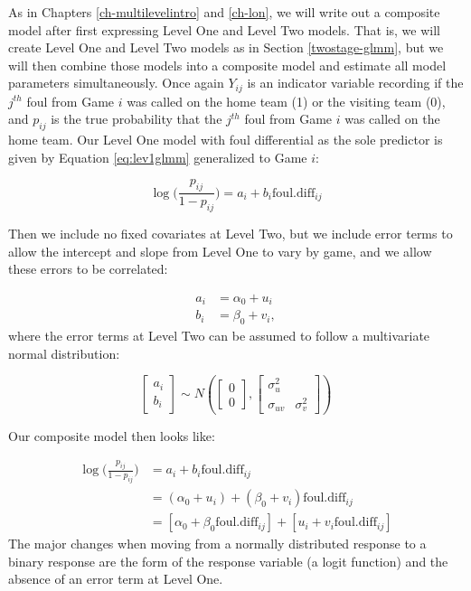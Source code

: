 \documentclass[
]{krantz}
\begin{document}
As in Chapters \ref{ch-multilevelintro} and \ref{ch-lon}, we will write out a composite model after first expressing Level One and Level Two models. That is, we will create Level One and Level Two models as in Section \ref{twostage-glmm}, but we will then combine those models into a composite model and estimate all model parameters simultaneously. Once again \(Y_{ij}\) is an indicator variable recording if the \(j^{th}\) foul from Game \(i\) was called on the home team (1) or the visiting team (0), and \(p_{ij}\) is the true probability that the \(j^{th}\) foul from Game \(i\) was called on the home team. Our Level One model with foul differential as the sole predictor is given by Equation \eqref{eq:lev1glmm} generalized to Game \(i\):

\[ \log\bigg(\frac{p_{ij}}{1-p_{ij}}\bigg)=a_i+b_i\mathrm{foul.diff}_{ij} \]

Then we include no fixed covariates at Level Two, but we include error terms to allow the intercept and slope from Level One to vary by game, and we allow these errors to be correlated:

\begin{align*}
a_i & = \alpha_{0}+u_i \\
b_i & = \beta_{0}+v_i,
\end{align*}
where the error terms at Level Two can be assumed to follow a multivariate normal distribution:

\[ \left[ \begin{array}{c}
            a_i \\ b_i
          \end{array}  \right] \sim N \left( \left[
          \begin{array}{c}
            0 \\ 0
          \end{array} \right], \left[
          \begin{array}{cc}
            \sigma_{u}^{2} & \\
            \sigma_{uv} & \sigma_{v}^{2}
          \end{array} \right] \right) \]

Our composite model then looks like:

\begin{align*}
\log\bigg(\frac{p_{ij}}{1-p_{ij}}\bigg) & = a_i+b_i\mathrm{foul.diff}_{ij} \\
 & = (\alpha_{0}+u_i) + (\beta_{0}+v_i)\mathrm{foul.diff}_{ij} \\
 & = [\alpha_{0}+\beta_{0}\mathrm{foul.diff}_{ij}]+[u_i+v_i\mathrm{foul.diff}_{ij}]
\end{align*}
The major changes when moving from a normally distributed response to a binary response are the form of the response variable (a logit function) and the absence of an error term at Level One.
\end{document}

